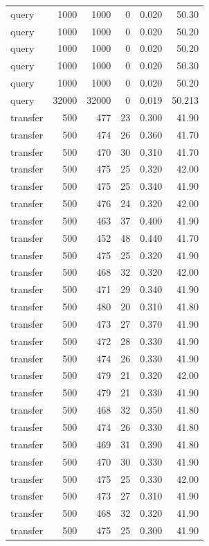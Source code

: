 \begin{table}[ht]
\begin{tabular}{lrrrrr}
query & 1000 & 1000 & 0 & 0.020 & 50.30 \\
query & 1000 & 1000 & 0 & 0.020 & 50.20 \\
query & 1000 & 1000 & 0 & 0.020 & 50.20 \\
query & 1000 & 1000 & 0 & 0.020 & 50.30 \\
query & 1000 & 1000 & 0 & 0.020 & 50.20 \\
query & 32000 & 32000 & 0 & 0.019 & 50.213 \\
\midrule
transfer & 500 & 477 & 23 & 0.300 & 41.90 \\
transfer & 500 & 474 & 26 & 0.360 & 41.70 \\
transfer & 500 & 470 & 30 & 0.310 & 41.70 \\
transfer & 500 & 475 & 25 & 0.320 & 42.00 \\
transfer & 500 & 475 & 25 & 0.340 & 41.90 \\
transfer & 500 & 476 & 24 & 0.320 & 42.00 \\
transfer & 500 & 463 & 37 & 0.400 & 41.90 \\
transfer & 500 & 452 & 48 & 0.440 & 41.70 \\
transfer & 500 & 475 & 25 & 0.320 & 41.90 \\
transfer & 500 & 468 & 32 & 0.320 & 42.00 \\
transfer & 500 & 471 & 29 & 0.340 & 41.90 \\
transfer & 500 & 480 & 20 & 0.310 & 41.80 \\
transfer & 500 & 473 & 27 & 0.370 & 41.90 \\
transfer & 500 & 472 & 28 & 0.330 & 41.90 \\
transfer & 500 & 474 & 26 & 0.330 & 41.90 \\
transfer & 500 & 479 & 21 & 0.320 & 42.00 \\
transfer & 500 & 479 & 21 & 0.330 & 41.90 \\
transfer & 500 & 468 & 32 & 0.350 & 41.80 \\
transfer & 500 & 474 & 26 & 0.330 & 41.80 \\
transfer & 500 & 469 & 31 & 0.390 & 41.80 \\
transfer & 500 & 470 & 30 & 0.330 & 41.90 \\
transfer & 500 & 475 & 25 & 0.330 & 42.00 \\
transfer & 500 & 473 & 27 & 0.310 & 41.90 \\
transfer & 500 & 468 & 32 & 0.320 & 41.90 \\
transfer & 500 & 475 & 25 & 0.300 & 41.90 \\

\end{tabular}
\end{table}
